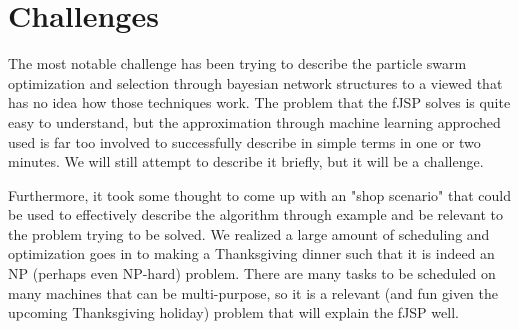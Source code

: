 \documentclass[11pt,twocolumn]{article}
\begin{document}
	\section{Challenges}
	
	The most notable challenge has been trying to describe the particle swarm optimization and selection through bayesian network structures to a viewed that has no idea how those techniques work.  The problem that the fJSP solves is quite easy to understand, but the approximation through machine learning approched used is far too involved to successfully describe in simple terms in one or two minutes.  We will still attempt to describe it briefly, but it will be a challenge.
	
	Furthermore, it took some thought to come up with an "shop scenario" that could be used to effectively describe the algorithm through example and be relevant to the problem trying to be solved.  We realized a large amount of scheduling and optimization goes in to making a Thanksgiving dinner such that it is indeed an NP (perhaps even NP-hard) problem.  There are many tasks to be scheduled on many machines that can be multi-purpose, so it is a relevant (and fun given the upcoming Thanksgiving holiday) problem that will explain the fJSP well.
	
\end{document}
